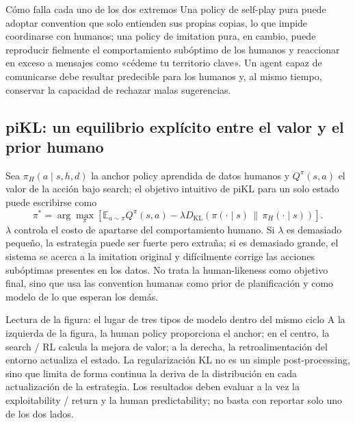 \begin{warningbox}{Cómo falla cada uno de los dos extremos}
Una policy de self-play pura puede adoptar convention que solo entienden sus propias copias, lo que impide coordinarse con humanos; una policy de imitation pura, en cambio, puede reproducir fielmente el comportamiento subóptimo de los humanos y reaccionar en exceso a mensajes como «cédeme tu territorio clave». Un agent capaz de comunicarse debe resultar predecible para los humanos y, al mismo tiempo, conservar la capacidad de rechazar malas sugerencias.
\end{warningbox}

\subsection{piKL: un equilibrio explícito entre el valor y el prior humano}

Sea $\pi_H(a\mid s,h,d)$ la anchor policy aprendida de datos humanos y $Q^{\pi}(s,a)$ el valor de la acción bajo search; el objetivo intuitivo de piKL para un solo estado puede escribirse como
\begin{equation}
\pi^*
=\arg\max_{\pi}
\left[
\mathbb{E}_{a\sim\pi}Q^{\pi}(s,a)
-\lambda D_{\mathrm{KL}}\!\left(\pi(\cdot\mid s)\,\|\,\pi_H(\cdot\mid s)\right)
\right].
\end{equation}
$\lambda$ controla el costo de apartarse del comportamiento humano. Si $\lambda$ es demasiado pequeño, la estrategia puede ser fuerte pero extraña; si es demasiado grande, el sistema se acerca a la imitation original y difícilmente corrige las acciones subóptimas presentes en los datos. No trata la human-likeness como objetivo final, sino que usa las convention humanas como prior de planificación y como modelo de lo que esperan los demás.


\begin{knowledgebox}{Lectura de la figura: el lugar de tres tipos de modelo dentro del mismo ciclo}
A la izquierda de la figura, la human policy proporciona el anchor; en el centro, la search / RL calcula la mejora de valor; a la derecha, la retroalimentación del entorno actualiza el estado. La regularización KL no es un simple post-processing, sino que limita de forma continua la deriva de la distribución en cada actualización de la estrategia. Los resultados deben evaluar a la vez la exploitability / return y la human predictability; no basta con reportar solo uno de los dos lados.
\end{knowledgebox}

